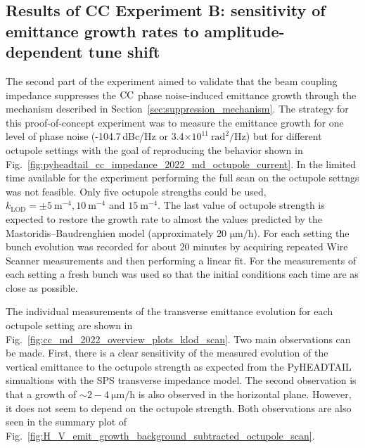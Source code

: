 \subsection{Results of CC Experiment B: sensitivity of emittance growth rates to amplitude-dependent tune shift}\label{subsec:cc_md_2022_octupole_scan}

The second part of the experiment aimed to validate that the beam coupling impedance suppresses the ${\mathrm{CC}}$ phase noise-induced emittance growth through the mechanism described in Section~\ref{sec:suppression_mechanism}. The strategy for this proof-of-concept experiment was to measure the emittance growth for one level of phase noise (-104.7\,dBc/Hz or 3.4$\times 10^{11} \ \mathrm{rad^2/Hz}$) but for different octupole settings with the goal of reproducing the behavior shown in Fig.~\ref{fig:pyheadtail_cc_impedance_2022_md_octupole_current}. In the limited time available for the experiment performing the full scan on the octupole settngs was not feasible. Only five octupole strengths could be used, $k_\mathrm{LOD} = \pm 5 \ \mathrm{m^{-4}}, 10 \ \mathrm{m^{-4}}$ and $15 \ \mathrm{m^{-4}}$. The last value of octupole strength is expected to restore the growth rate to almost the values predicted by the Mastoridis--Baudrenghien model (approximately 20 $\mathrm{\mu m/h}$). For each setting the bunch evolution was recorded for about 20 minutes by acquiring repeated Wire Scanner measurements and then performing a linear fit. For the measurements of each setting a fresh bunch was used so that the initial conditions each time are as close as possible.

The individual measurements of the transverse emittance evolution for each octupole setting are shown in Fig.~\ref{fig:cc_md_2022_overview_plots_klod_scan}. Two main observations can be made. First, there is a clear sensitivity of the measured evolution of the vertical emittance to the octupole strength as expected from the PyHEADTAIL simualtions with the SPS transverse impedance model. The second observation is that a growth of $\sim 2-4 \ \mathrm{\mu m/h}$ is also observed in the horizontal plane. However, it does not seem to depend on the octupole strength. Both observations are also seen in the summary plot of Fig.~\ref{fig:H_V_emit_growth_background_subtracted_octupole_scan}.

